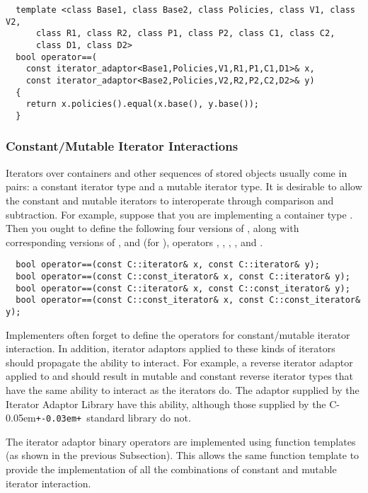 \documentclass{netobjectdays}
\newcommand{\Cpp}{C\kern-0.05em\texttt{+\kern-0.03em+}}
\newcommand{\reverseiterator}{\code{reverse\_\-iterator}}
\begin{document}
{\footnotesize
\begin{verbatim}
  template <class Base1, class Base2, class Policies, class V1, class V2,
      class R1, class R2, class P1, class P2, class C1, class C2, 
      class D1, class D2>
  bool operator==(
    const iterator_adaptor<Base1,Policies,V1,R1,P1,C1,D1>& x,
    const iterator_adaptor<Base2,Policies,V2,R2,P2,C2,D2>& y)
  {
    return x.policies().equal(x.base(), y.base());
  }
\end{verbatim}
}

\subsubsection{Constant/Mutable Iterator Interactions}
\label{sec:constant-mutable-iterations}

Iterators over containers and other sequences of stored objects
usually come in pairs: a constant iterator type and a mutable iterator
type. It is desirable to allow the constant and mutable iterators to
interoperate through comparison and subtraction. For example, suppose
that you are implementing a container type . Then you ought to
define the following four versions of , along with
corresponding versions of , and (for
), operators \code{<}, \code{>},
\code{<=}, \code{>=}, and \code{-}.

{\footnotesize
\begin{verbatim}
  bool operator==(const C::iterator& x, const C::iterator& y);
  bool operator==(const C::const_iterator& x, const C::iterator& y);
  bool operator==(const C::iterator& x, const C::const_iterator& y);
  bool operator==(const C::const_iterator& x, const C::const_iterator& y);
\end{verbatim}
}

Implementers often forget to define the operators for constant/mutable
iterator interaction. In addition, iterator adaptors applied to these
kinds of iterators should propagate the ability to interact. For
example, a reverse iterator adaptor applied to  and
 should result in mutable and constant
reverse iterator types that have the same ability to interact as the
 iterators do. The \reverseiterator{} adaptor supplied by
the Iterator Adaptor Library have this ability, although those
supplied by the \Cpp\ standard library do not.

The iterator adaptor binary operators are implemented using function
templates (as shown in the previous Subsection). This allows the same
function template to provide the implementation of all the
combinations of constant and mutable iterator interaction.
\end{document}
